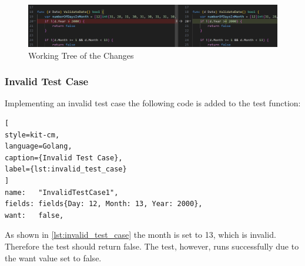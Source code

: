 \begin{figure}[H]
    \centering
    \includegraphics[width=\textwidth]{figures/goLang/carRental/carRental_dateTestWorkingTree.png}
    \caption{Working Tree of the Changes}
    \label{fig:car_rental_test_working_tree}
\end{figure}

\subsubsection*{Invalid Test Case}
Implementing an invalid test case the following code is added to the test function:
\begin{lstlisting}[
style=kit-cm,
language=Golang,
caption={Invalid Test Case},
label={lst:invalid_test_case}
]
name:   "InvalidTestCase1",
fields: fields{Day: 12, Month: 13, Year: 2000},
want:   false,  
\end{lstlisting}

As shown in \autoref{lst:invalid_test_case} the month is set to 13, which is invalid.
Therefore the test should return false.
The test, however, runs successfully due to the want value set to false.
